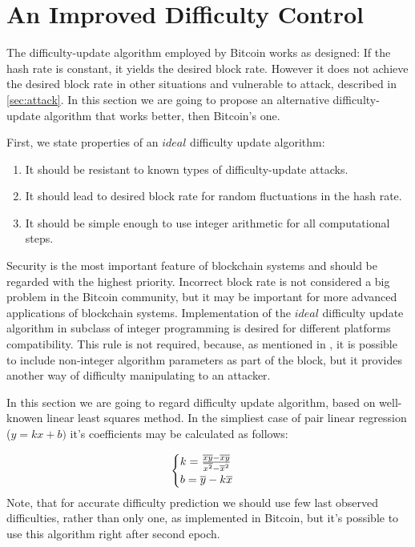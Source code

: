 \documentclass[number,preprint,review]{elsarticle}
\begin{document}
\section{An Improved Difficulty Control}
\label{sec:improved}

The difficulty-update algorithm employed by Bitcoin works as designed: If the hash rate is constant, it yields the desired block rate.
However it does not achieve the desired block rate in other situations and vulnerable to attack, described in \ref{sec:attack}.
In this section we are going to propose an alternative difficulty-update algorithm that works better, then Bitcoin's one.

First, we state properties of an \(ideal\) difficulty update algorithm:
\begin{enumerate}
\item{It should be resistant to known types of difficulty-update attacks.}
\item{It should lead to desired block rate for random fluctuations in the hash rate.}
\item{It should be simple enough to use integer arithmetic for all computational steps.}
\end{enumerate}
Security is the most important feature of blockchain systems and should be regarded with the highest priority.
Incorrect block rate is not considered a big problem in the Bitcoin community, but it may be important for more advanced applications of blockchain systems.
Implementation of the \(ideal\) difficulty update algorithm in subclass of integer programming is desired for different platforms compatibility.
This rule is not required, because, as mentioned in \cite{kraft2015difficulty}, it is possible to include non-integer algorithm parameters as part of the block, but it provides another way of difficulty manipulating to an attacker.

In this section we are going to regard difficulty update algorithm, based on well-knowen linear least squares method\cite{lawson1974solving}.
In the simpliest case of pair linear regression (\(y=kx+b)\) it's coefficients may be calculated as follows:

\begin{equation}
  \begin{cases}
    k= {{\overline{xy} - \overline{x}\overline{y}} \over {\overline{x^2} - \overline{x}^2}}  \\
    b=\overline{y}-k\overline{x}
  \end{cases}
\end{equation}
Note, that for accurate difficulty prediction we should use few last observed difficulties, rather than only one, as implemented in Bitcoin, but it's possible to use this algorithm right after second epoch.
\end{document}
